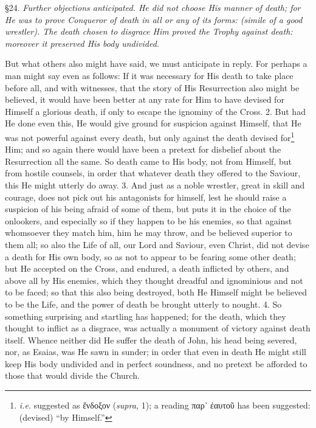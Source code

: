 §24. \emph{Further objections anticipated. He did not choose His manner of death; for He was to prove Conqueror of death in all or any of its forms: (simile of a good wrestler). The death chosen to disgrace Him proved the Trophy against death: moreover it preserved His body undivided.}

But what others also might have said, we must anticipate in reply. For perhaps a man might say even as follows: If it was necessary for His death to take place before all, and with witnesses, that the story of His Resurrection also might be believed, it would have been better at any rate for Him to have devised for Himself a glorious death, if only to escape the ignominy of the Cross. 2. But had He done even this, He would give ground for suspicion against Himself, that He was not powerful against every death, but only against the death devised for\footnote{\emph{i.e.} suggested as \textgreek{ἔνδοξον} (\emph{supra,} 1); a reading \textgreek{παρ᾽ ἐαυτοῦ} has been suggested: (devised) “by Himself.”} Him; and so again there would have been a pretext for disbelief about the Resurrection all the same. So death came to His body, not from Himself, but from hostile counsels, in order that whatever death they offered to the Saviour, this He might utterly do away. 3. And just as a noble wrestler, great in skill and courage, does not pick out his antagonists for himself, lest he should raise a suspicion of his being afraid of some of them, but puts it in the choice of the onlookers, and especially so if they happen to be his enemies, so that against whomsoever they match him, him he may throw, and be believed superior to them all; so also the Life of all, our Lord and Saviour, even Christ, did not devise a death for His own body, so as not to appear to be fearing some other death; but He accepted on the Cross, and endured, a death inflicted by others, and above all by His enemies, which they thought dreadful and ignominious and not to be faced; so that this also being destroyed, both He Himself might be believed to be the Life, and the power of death be brought utterly to nought. 4. So something surprising and startling has happened; for the death, which they thought to inflict as a disgrace, was actually a monument of victory against death itself. Whence neither did He suffer the death of John, his head being severed, nor, as Esaias, was He sawn in sunder; in order that even in death He might still keep His body undivided and in perfect soundness, and no pretext be afforded to those that would divide the Church.


